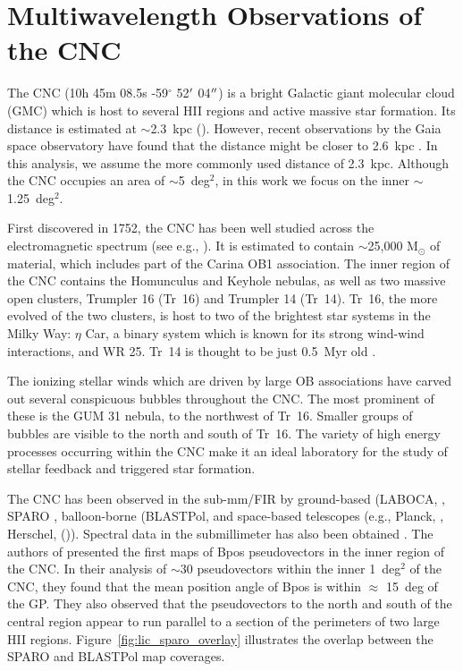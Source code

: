 \section{Multiwavelength Observations of the CNC}\label{multiband comp}

The CNC (10h 45m 08.5s -59$^{\circ}$ 52$\operatorname{^{\prime}}$ 04$\operatorname{^{\prime\prime}}$) is a bright Galactic giant molecular cloud (GMC) which is host to several HII regions and active massive star formation. Its distance is estimated at $\sim$2.3~kpc (\citet{allen1993shape,smith2006structure}). However, recent observations by the Gaia space observatory have found that the distance might be closer to 2.6~kpc \citep{davidson2018gaia}. In this analysis, we assume the more commonly used distance of 2.3~kpc. Although the CNC occupies an area of $\sim$5~deg$^{2}$, in this work we focus on the inner $\sim$1.25~deg$^{2}$.

First discovered in 1752, the CNC has been well studied across the electromagnetic spectrum (see e.g., \citet{smith2008carina}). It is estimated to contain $\sim$25,000 M$_{\odot}$ of material, which includes part of the Carina OB1 association. The inner region of the CNC contains the Homunculus and Keyhole nebulas, as well as two massive open clusters, Trumpler 16 (Tr~16) and Trumpler 14 (Tr~14). Tr~16, the more evolved of the two clusters, is host to two of the brightest star systems in the Milky Way: $\eta$ Car, a binary system which is known for its strong wind-wind interactions, and WR 25. Tr~14 is thought to be just 0.5~Myr old \citep{preibisch2011hawk}.

The ionizing stellar winds which are driven by large OB associations have carved out several conspicuous bubbles throughout the CNC. The most prominent of these is the GUM 31 nebula, to the northwest of Tr~16. Smaller groups of bubbles are visible to the north and south of Tr~16. The variety of high energy processes occurring within the CNC make it an ideal laboratory for the study of stellar feedback and triggered star formation.

The CNC has been observed in the sub-mm/FIR by ground-based (LABOCA, \citep{preibisch2011laboca}, SPARO \citep{li2006results}, balloon-borne (BLASTPol, \citep{shariff2019submillimeter} and space-based telescopes (e.g., Planck, \citep{planck2014planck}, Herschel, (\citet{preibisch2012herschel,gaczkowski2013herschel,roccatagliata2013herschel})). Spectral data in the submillimeter has also been obtained \citep{oberst2006detection}. The authors of \citet{li2006results} presented the first maps of \gls{Bpos} pseudovectors in the inner region of the CNC. In their analysis of $\sim$30 pseudovectors within the inner 1~deg$^{2}$ of the CNC, they found that the mean position angle of \gls{Bpos} is within $\approx$ 15~deg of the GP. They also observed that the pseudovectors to the north and south of the central region appear to run parallel to a section of the perimeters of two large HII regions. Figure~\ref{fig:lic_sparo_overlay} illustrates the overlap between the SPARO and BLASTPol map coverages.

